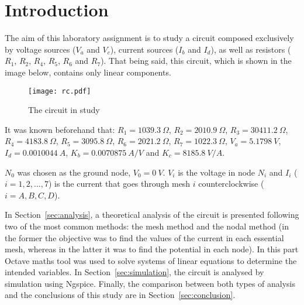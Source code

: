 \section{Introduction}
\label{sec:introduction}

\par
The aim of this laboratory assignment is to study a circuit composed exclusively by voltage sources ($V_a$ and $V_c$), current sources ($I_b$ and $I_d$), as well as resistors ($R_1$, $R_2$, $R_4$, $R_5$, $R_6$ and $R_7$). That being said, this circuit, which is shown in the image below, contains only linear components.

\begin{figure}[h] \centering
\texttt{[image: rc.pdf]}
\caption{The circuit in study}
\label{fig:rc}
\end{figure}

\par
It was known beforehand that:
$R_1 = 1039.3 \ \Omega$,
$R_2 = 2010.9 \ \Omega$,
$R_3 = 30411.2 \ \Omega$,
$R_4 = 4183.8 \ \Omega$,
$R_5 = 3095.8 \ \Omega$,
$R_6 = 2021.2 \ \Omega$,
$R_7 = 1022.3 \ \Omega$,
$V_a = 5.1798 \ V$,
$I_d = 0.0010044 \ A$,
$K_b = 0.0070875 \ A/V$ and
$K_c = 8185.8 \ V/A$.


\par
$N_0$ was chosen as the ground node, $V_0 = 0 \ V$. $V_i$ is the voltage in node $N_i$ and $I_i$ ($i=1, 2, ..., 7$) is the current that goes through mesh $i$ counterclockwise ($i=A, B, C, D$).

\par
In Section~\ref{sec:analysis}, a theoretical analysis of the circuit is presented following two of the most common methods: the mesh method and the nodal method (in the former the objective was to find the values of the current in each essential mesh, whereas in the latter it was to find the potential in each node). In this part Octave maths tool was used to solve systems of linear equations to determine the intended variables. In Section~\ref{sec:simulation}, the circuit is analysed by simulation using Ngspice. Finally, the  comparison between both types of analysis and the conclusions of this study are in Section~\ref{sec:conclusion}.

